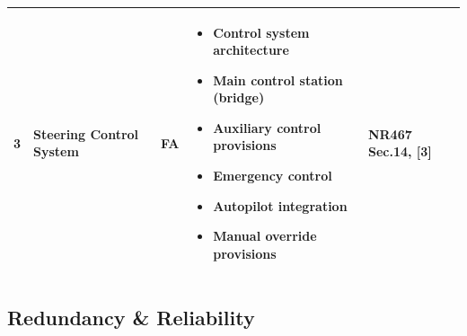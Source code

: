 \documentclass[11pt,a4paper]{report}
\newcommand{\fa}{\textbf{\textcolor{warningred}{FA}}}
\begin{document}
\begin{longtable}{|p{0.5cm}|p{5cm}|p{1.5cm}|p{5.5cm}|p{2cm}|}
3 & Steering Control System & \fa{} & 
\begin{itemize}[leftmargin=*,nosep]
\item Control system architecture
\item Main control station (bridge)
\item Auxiliary control provisions
\item Emergency control
\item Autopilot integration
\item Manual override provisions
\end{itemize} & NR467 Sec.14, [3] \\
\hline

\end{longtable}

\subsection{Redundancy \& Reliability}
\end{document}
